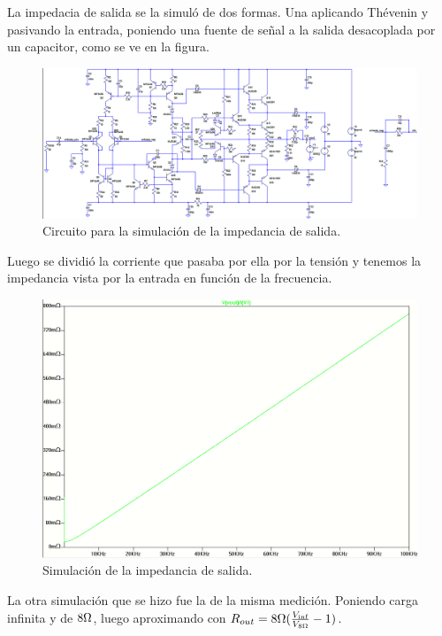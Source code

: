La impedacia de salida se la simuló de dos formas. Una aplicando Thévenin y pasivando la entrada, poniendo una fuente de señal a la salida desacoplada por un capacitor, como se ve en la figura.

\begin{figure}[H]
\centering
\includegraphics[width=1\textwidth]{img/Rout_circ_1.png}
\caption{Circuito para la simulación de la impedancia de salida.}
\label{Rout_sim_circ}
\end{figure}

Luego se dividió la corriente que pasaba por ella por la tensión y tenemos la impedancia vista por la entrada en función de la frecuencia.

\begin{figure}[H]
\centering
\includegraphics[width=1\textwidth]{img/Rout_1.png}
\caption{Simulación de la impedancia de salida.}
\label{Rout_sim}
\end{figure}

La otra simulación que se hizo fue la de la misma medición. Poniendo carga infinita y de $8\ohm$, luego aproximando con $R_{out}=8\ohm(\frac{V_{\inf}}{V_{8\ohm}}-1)$.

